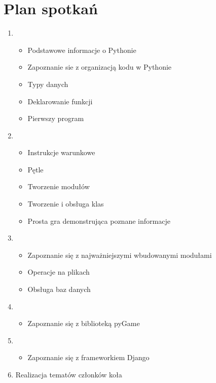 \documentclass[a4paper,12pt]{article}
\begin{document}
\section{Plan spotkań}
\begin{enumerate}
\item \begin{itemize}
\item Podstawowe informacje o Pythonie
\item Zapoznanie sie z organizacją kodu w Pythonie
\item Typy danych
\item Deklarowanie funkcji
\item Pierwszy program
\end{itemize}
\item \begin{itemize}
\item Instrukcje warunkowe
\item Pętle
\item Tworzenie modułów
\item Tworzenie i obsługa klas
\item Prosta gra demonstrująca poznane informacje
\end{itemize}
\item \begin{itemize}
\item Zapoznanie się z najważniejszymi wbudowanymi modułami
\item Operacje na plikach
\item Obsługa baz danych
\end{itemize}
\item \begin{itemize}
\item Zapoznanie się z biblioteką pyGame
\end{itemize}
\item \begin{itemize}
\item Zapoznanie się z frameworkiem Django
\end{itemize}
\item Realizacja tematów członków koła
\end{enumerate}
\end{document}
